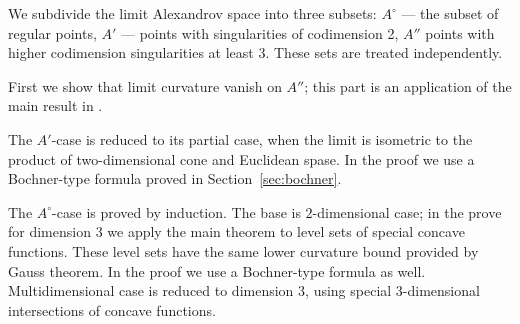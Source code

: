 We subdivide the limit Alexandrov space into
three subsets: $A^\circ$ --- the subset of regular 
points, $A'$ --- points with singularities of codimension 2,
$A''$ points with higher codimension singularities at least 3.
These sets are treated independently.

First we show that limit curvature vanish on $A''$; 
this part is an application of the main result in \cite{petrunin-SC}.

The $A'$-case is reduced to its partial case, when the limit is isometric to the product of two-dimensional cone and Euclidean spase.
In the proof we use a Bochner-type formula proved in Section~\ref{sec:bochner}.

The $A^\circ$-case is proved by induction.
The base is $2$-dimensional case; in the prove for dimension $3$ we apply the main theorem to level sets of special concave functions.
These level sets have the same lower curvature bound provided by Gauss theorem. 
In the proof we use a Bochner-type formula as well.
Multidimensional case is reduced to dimension $3$, using special $3$-dimensional intersections of concave functions.

